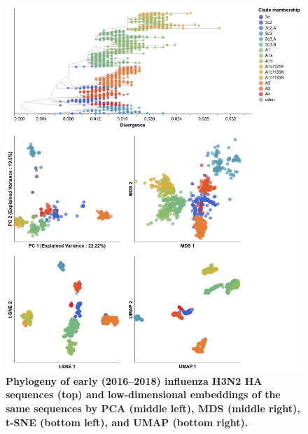 \documentclass[10pt,letterpaper]{article}
\begin{document}

\begin{figure}[!h]
\includegraphics[width=\columnwidth]{figures/flu-2016-2018-ha-embeddings-by-clade.png}
\caption{{\bf Phylogeny of early (2016--2018) influenza H3N2 HA sequences (top) and low-dimensional embeddings of the same sequences by PCA (middle left), MDS (middle right), t-SNE (bottom left), and UMAP (bottom right).}
}
\label{fig:seasonal-influenza-h3n2-ha-embeddings}
\end{figure}
\end{document}
